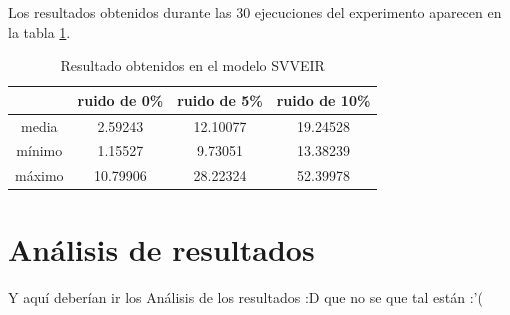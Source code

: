 Los resultados obtenidos durante las 30 ejecuciones del experimento aparecen en la tabla \ref{table:experiment_SVVEIR}.

\begin{table}[!h]
    \centering
    \caption{Resultado obtenidos en el modelo SVVEIR}
    \begin{tabular}{|c|c|c|c|}
        \hline
               & \textbf{ruido de 0\%} & \textbf{ruido de 5\%} & \textbf{ruido de 10\%} \\
        \hline
        media  & 2.59243               & 12.10077              & 19.24528               \\
        \hline
        mínimo & 1.15527               & 9.73051               & 13.38239               \\
        \hline
        máximo & 10.79906              & 28.22324              & 52.39978               \\
        \hline
    \end{tabular}
    \label{table:experiment_SVVEIR}
\end{table}

\section{Análisis de resultados}

Y aquí deberían ir los Análisis de los resultados :D que no se que tal están :'(